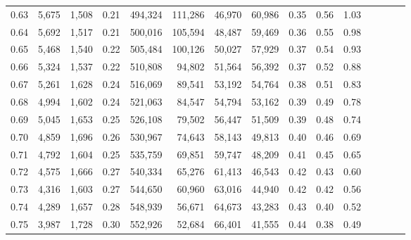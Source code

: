 \begin{tabular}{rrrcrrrrrrrrrrr}
0.63 &   5,675 &  1,508 &                                       0.21 &  494,324 &  111,286 &   46,970 &   60,986 &  0.35 &  0.56 &                         1.03 \\
0.64 &   5,692 &  1,517 &                                       0.21 &  500,016 &  105,594 &   48,487 &   59,469 &  0.36 &  0.55 &                         0.98 \\
0.65 &   5,468 &  1,540 &                                       0.22 &  505,484 &  100,126 &   50,027 &   57,929 &  0.37 &  0.54 &                         0.93 \\
0.66 &   5,324 &  1,537 &                                       0.22 &  510,808 &   94,802 &   51,564 &   56,392 &  0.37 &  0.52 &                         0.88 \\
0.67 &   5,261 &  1,628 &                                       0.24 &  516,069 &   89,541 &   53,192 &   54,764 &  0.38 &  0.51 &                         0.83 \\
0.68 &   4,994 &  1,602 &                                       0.24 &  521,063 &   84,547 &   54,794 &   53,162 &  0.39 &  0.49 &                         0.78 \\
0.69 &   5,045 &  1,653 &                                       0.25 &  526,108 &   79,502 &   56,447 &   51,509 &  0.39 &  0.48 &                         0.74 \\
0.70 &   4,859 &  1,696 &                                       0.26 &  530,967 &   74,643 &   58,143 &   49,813 &  0.40 &  0.46 &                         0.69 \\
0.71 &   4,792 &  1,604 &                                       0.25 &  535,759 &   69,851 &   59,747 &   48,209 &  0.41 &  0.45 &                         0.65 \\
0.72 &   4,575 &  1,666 &                                       0.27 &  540,334 &   65,276 &   61,413 &   46,543 &  0.42 &  0.43 &                         0.60 \\
0.73 &   4,316 &  1,603 &                                       0.27 &  544,650 &   60,960 &   63,016 &   44,940 &  0.42 &  0.42 &                         0.56 \\
0.74 &   4,289 &  1,657 &                                       0.28 &  548,939 &   56,671 &   64,673 &   43,283 &  0.43 &  0.40 &                         0.52 \\
0.75 &   3,987 &  1,728 &                                       0.30 &  552,926 &   52,684 &   66,401 &   41,555 &  0.44 &  0.38 &                         0.49 \\

\end{tabular}
